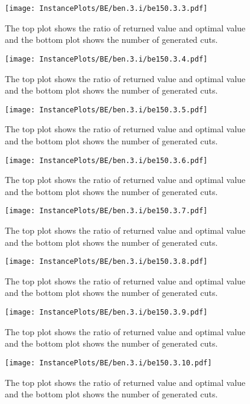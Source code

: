 \documentclass[10pt,a4paper]{article}
\begin{document}
\begin{figure}[H]
\texttt{[image: InstancePlots/BE/ben.3.i/be150.3.3.pdf]}
\caption{The top plot shows the ratio of returned value and optimal value     and the bottom plot shows the number of generated cuts.}
\end{figure}

\begin{figure}[H]
\texttt{[image: InstancePlots/BE/ben.3.i/be150.3.4.pdf]}
\caption{The top plot shows the ratio of returned value and optimal value     and the bottom plot shows the number of generated cuts.}
\end{figure}

\begin{figure}[H]
\texttt{[image: InstancePlots/BE/ben.3.i/be150.3.5.pdf]}
\caption{The top plot shows the ratio of returned value and optimal value     and the bottom plot shows the number of generated cuts.}
\end{figure}

\begin{figure}[H]
\texttt{[image: InstancePlots/BE/ben.3.i/be150.3.6.pdf]}
\caption{The top plot shows the ratio of returned value and optimal value     and the bottom plot shows the number of generated cuts.}
\end{figure}

\begin{figure}[H]
\texttt{[image: InstancePlots/BE/ben.3.i/be150.3.7.pdf]}
\caption{The top plot shows the ratio of returned value and optimal value     and the bottom plot shows the number of generated cuts.}
\end{figure}

\begin{figure}[H]
\texttt{[image: InstancePlots/BE/ben.3.i/be150.3.8.pdf]}
\caption{The top plot shows the ratio of returned value and optimal value     and the bottom plot shows the number of generated cuts.}
\end{figure}

\begin{figure}[H]
\texttt{[image: InstancePlots/BE/ben.3.i/be150.3.9.pdf]}
\caption{The top plot shows the ratio of returned value and optimal value     and the bottom plot shows the number of generated cuts.}
\end{figure}

\begin{figure}[H]
\texttt{[image: InstancePlots/BE/ben.3.i/be150.3.10.pdf]}
\caption{The top plot shows the ratio of returned value and optimal value     and the bottom plot shows the number of generated cuts.}
\end{figure}
\end{document}
